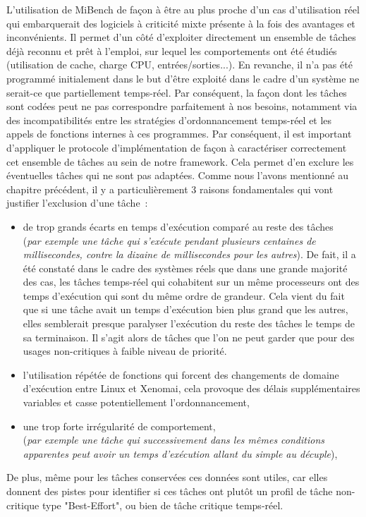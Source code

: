 \documentclass[french, a4paper, 11pt, twoside, pdftex]{StyleThese}
\begin{document}
	L'utilisation de MiBench de façon à être au plus proche d'un cas d'utilisation réel qui embarquerait des logiciels à criticité mixte présente à la fois des avantages et inconvénients. Il permet d'un côté d'exploiter directement un ensemble de tâches déjà reconnu et prêt à l'emploi, sur lequel les comportements ont été étudiés (utilisation de cache, charge CPU, entrées/sorties...). En revanche, il n'a pas été programmé initialement dans le but d'être exploité dans le cadre d'un système ne serait-ce que partiellement temps-réel. Par conséquent, la façon dont les tâches sont codées peut ne pas correspondre parfaitement à nos besoins, notamment via des incompatibilités entre les stratégies d'ordonnancement temps-réel et les appels de fonctions internes à ces programmes.
	Par conséquent, il est important d'appliquer le protocole d'implémentation de façon à caractériser correctement cet ensemble de tâches au sein de notre framework. Cela permet d'en exclure les éventuelles tâches qui ne sont pas adaptées. Comme nous l'avons mentionné au chapitre précédent, il y a particulièrement 3 raisons fondamentales qui vont justifier l'exclusion d'une tâche~: 
	\begin{itemize}
		\item de trop grands écarts en temps d'exécution comparé au reste des tâches \\
		(\textit{par exemple une tâche qui s'exécute pendant plusieurs centaines de millisecondes, contre la dizaine de millisecondes pour les autres}). De fait, il a été constaté dans le cadre des systèmes réels que dans une grande majorité des cas, les tâches temps-réel qui cohabitent sur un même processeurs ont des temps d'exécution qui sont du même ordre de grandeur. Cela vient du fait que si une tâche avait un temps d'exécution bien plus grand que les autres, elles semblerait presque paralyser l'exécution du reste des tâches le temps de sa terminaison. Il s'agit alors de tâches que l'on ne peut garder que pour des usages non-critiques à faible niveau de priorité.
		\item l'utilisation répétée de fonctions qui forcent des changements de domaine d'exécution entre Linux et Xenomai, cela provoque des délais supplémentaires variables et casse potentiellement l'ordonnancement,
		\item une trop forte irrégularité de comportement, \\
		(\textit{par exemple une tâche qui successivement dans les mêmes conditions apparentes peut avoir un temps d'exécution allant du simple au décuple}), 
	\end{itemize}
	De plus, même pour les tâches conservées ces données sont utiles, car elles donnent des pistes pour identifier si ces tâches ont plutôt un profil de tâche non-critique type "Best-Effort", ou bien de tâche critique temps-réel. 
	
\end{document}
